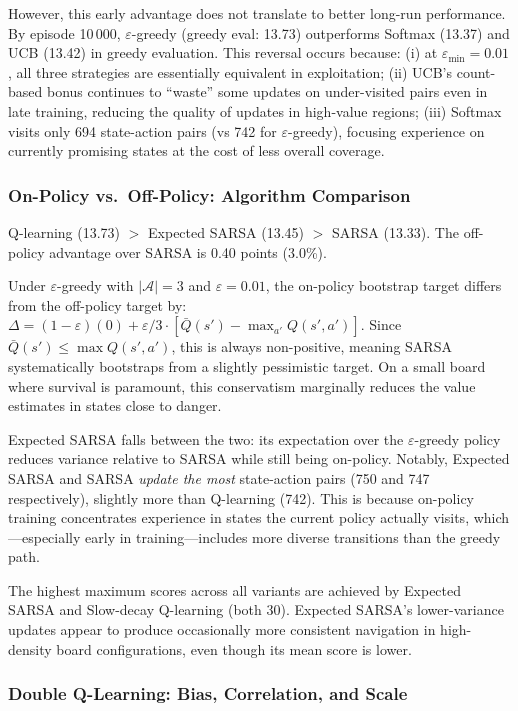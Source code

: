 \documentclass[10pt,conference]{IEEEtran}
\begin{document}
However, this early advantage does not translate to better
long-run performance.
By episode 10\,000, $\varepsilon$-greedy (greedy eval: 13.73)
outperforms Softmax (13.37) and UCB (13.42) in greedy evaluation.
This reversal occurs because:
(i) at $\varepsilon_{\min}=0.01$, all three strategies are essentially
equivalent in exploitation;
(ii) UCB's count-based bonus continues to ``waste'' some updates on
under-visited pairs even in late training, reducing the quality of
updates in high-value regions;
(iii) Softmax visits only 694 state-action pairs (vs 742 for
$\varepsilon$-greedy), focusing experience on currently promising
states at the cost of less overall coverage.

\subsubsection{On-Policy vs.\ Off-Policy: Algorithm Comparison}

Q-learning (13.73) $>$ Expected SARSA (13.45) $>$ SARSA (13.33).
The off-policy advantage over SARSA is 0.40 points (3.0\%).

Under $\varepsilon$-greedy with $|\mathcal{A}|=3$ and
$\varepsilon=0.01$, the on-policy bootstrap target differs from
the off-policy target by:
$\Delta = (1-\varepsilon)(0) + \varepsilon/3 \cdot
[\bar{Q}(s')-\max_{a'}Q(s',a')]$.
Since $\bar{Q}(s')\leq\max Q(s',a')$, this is always non-positive,
meaning SARSA systematically bootstraps from a slightly pessimistic
target.
On a small board where survival is paramount, this conservatism
marginally reduces the value estimates in states close to danger.

Expected SARSA falls between the two: its expectation over the
$\varepsilon$-greedy policy reduces variance relative to SARSA while
still being on-policy.
Notably, Expected SARSA and SARSA \emph{update the most}
state-action pairs (750 and 747 respectively), slightly more than
Q-learning (742).
This is because on-policy training concentrates experience in states
the current policy actually visits, which---especially early in
training---includes more diverse transitions than the greedy path.

The highest maximum scores across all variants are achieved by
Expected SARSA and Slow-decay Q-learning (both 30).
Expected SARSA's lower-variance updates appear to produce
occasionally more consistent navigation in high-density
board configurations, even though its mean score is lower.

\subsubsection{Double Q-Learning: Bias, Correlation, and Scale}
\end{document}
